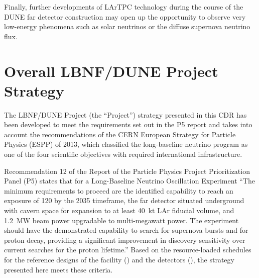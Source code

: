 
Finally, further developments of LArTPC %
technology during the course of the DUNE far detector construction may open up the opportunity
to observe very low-energy phenomena such as solar neutrinos or the diffuse supernova neutrino flux.


\section{Overall LBNF/DUNE Project Strategy} %

The LBNF/DUNE Project (the ``Project'') strategy presented in this CDR has been developed to meet the requirements 
set out in the P5 report and %
takes into account the recommendations of the CERN European Strategy for Particle 
Physics (ESPP) of 2013, which classified the long-baseline neutrino program as 
one of the four scientific objectives with required international infrastructure.

Recommendation 12 of the Report of the Particle Physics Project Prioritization Panel (P5) 
states that for a Long-Baseline Neutrino Oscillation Experiment ``The 
minimum requirements to proceed are the identified capability to reach an exposure 
of \num{120}\ktMWyr{} by the 2035 timeframe, the far detector situated underground 
with cavern space for expansion to at least 40~kt LAr fiducial volume, and 1.2~MW 
beam power upgradable to multi-megawatt power. The experiment should have the demonstrated 
capability to search for supernova bursts and for proton decay, providing a significant 
improvement in discovery sensitivity over current searches for the proton lifetime.'' 
Based on the resource-loaded schedules for the reference designs of the facility (\vollbnf)
and the detectors (\voldune), the strategy presented here meets these criteria. 

